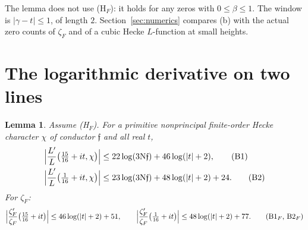 \documentclass[11pt]{article}
\newtheorem{lemma}{Lemma}[section]
\theoremstyle{definition}
\theoremstyle{remark}
\numberwithin{equation}{section}
\newcommand{\ff}{\mathfrak f}
\newcommand{\Nm}{\mathrm N}
\newcommand{\HF}{\textup{(H$_F$)}}
\begin{document}
The lemma does not use \HF{}: it holds for any zeros with $0\le\beta\le1$. The window is $|\gamma-t|\le1$, of length $2$. Section~\ref{sec:numerics} compares (b) with the actual zero counts of $\zeta_F$ and of a cubic Hecke $L$-function at small heights.

\section{The logarithmic derivative on two lines}\label{sec:lines}

\begin{lemma}\label{lem:lines}
Assume \HF. For a primitive nonprincipal finite-order Hecke character $\chi$ of conductor $\ff$ and all real $t$,
\begin{align}
 \Bigl|\frac{L'}{L}\bigl(\tfrac{15}{16}+it,\chi\bigr)\Bigr|&\le22\log(3\Nm\ff)+46\log(|t|+2),\tag{B1}\label{eq:B1}\\
 \Bigl|\frac{L'}{L}\bigl(\tfrac{1}{16}+it,\chi\bigr)\Bigr|&\le23\log(3\Nm\ff)+48\log(|t|+2)+24 .\tag{B2}\label{eq:B2}
\end{align}
For $\zeta_F$:
\begin{equation}
 \Bigl|\frac{\zeta_F'}{\zeta_F}\bigl(\tfrac{15}{16}+it\bigr)\Bigr|\le46\log(|t|+2)+51,\qquad
 \Bigl|\frac{\zeta_F'}{\zeta_F}\bigl(\tfrac{1}{16}+it\bigr)\Bigr|\le48\log(|t|+2)+77 .\tag{B1$_F$, B2$_F$}\label{eq:BF}
\end{equation}
\end{lemma}
\end{document}
